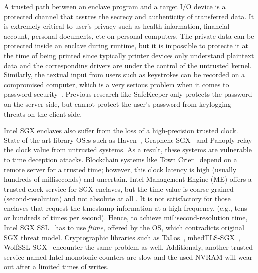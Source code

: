 A trusted path between an enclave program and a target I/O device is a protected channel that assures the secrecy and authenticity of transferred data. It is extremely critical to user's privacy such as health information, financial account, personal documents, etc on personal computers. The private data can be protected inside an enclave during runtime, but it is impossible to protecte it at the time of being printed since typically printer devices only understand plaintext data and the corresponding drivers are under the control of the untrusted kernel. Similarly, the textual input from users such as keystrokes can be recorded on a compromised computer, which is a very serious problem when it comes to password security~\cite{DBLP:conf/uss/SilverJBCJ14}. Previous research like SafeKeeper \cite{DBLP:conf/www/KrawieckaKPMA18} only protects the password on the server side, but cannot protect the user's password from keylogging threats on the client side.

Intel SGX enclaves also suffer from the loss of a high-precision trusted clock.
State-of-the-art library OSes such as Haven~\cite{DBLP:journals/tocs/BaumannPH15}, Graphene-SGX~\cite{DBLP:conf/usenix/TsaiPV17} and Panoply \cite{shinde_panoply:_2017} relay the clock value from  untrusted systems. As a result, these systems are vulnerable to time deception attacks. Blockchain systems like Town Crier~\cite{DBLP:conf/ccs/ZhangCCJS16} depend on a remote server for a trusted time; however, this clock latency is high (usually hundreds of milliseconds) and uncertain. Intel Management Engine (ME) offers a trusted clock service for SGX enclaves, but the time value is coarse-grained (second-resolution) and not absolute at all \cite{intel_psw}. It is not satisfactory for those enclaves that request the timestamp information at a high frequency, (e.g., tens or hundreds of times per second). Hence, to achieve millisecond-resolution time, Intel SGX SSL~\cite{intel_sgx_ssl} has to use \textit{ftime}, offered by the OS, which contradicts original SGX threat model. Cryptographic libraries such as TaLos~\cite{TaLoS}, mbedTLS-SGX~\cite{mbedtls}, WolfSSL-SGX~\cite{wolfSSL} encounter the same problem as well. Additionaly, another trusted service named Intel monotonic counters are slow and the used NVRAM will wear out after a limited times of writes.

